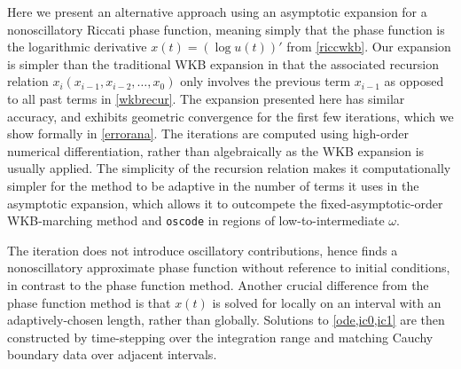\documentclass[10pt]{article}
\begin{document}
Here we present an alternative approach using
an asymptotic expansion for a nonoscillatory
Riccati phase function, meaning simply that the
phase function is the logarithmic derivative $x(t) = (\log u(t))'$ from \cref{riccwkb}.
%
Our expansion is simpler than the traditional WKB expansion in that the
associated recursion relation $x_i(x_{i-1}, x_{i-2}, \ldots, x_0)$ only
involves the previous term $x_{i-1}$ as opposed to all past terms in
\cref{wkbrecur}. 
%
The expansion presented here has similar accuracy, and
exhibits geometric convergence for the first few iterations, which we show
formally in \cref{errorana}. The iterations are computed using high-order
numerical differentiation, rather than algebraically as the WKB expansion is
usually applied.
%
The simplicity of the recursion relation makes it
computationally simpler for the method to be adaptive in the number of terms it
uses in the asymptotic expansion, which allows it to outcompete the
fixed-asymptotic-order WKB-marching method \cite{korner2022wkb,arnold2011wkb}
and \texttt{oscode} \cite{agocs2020efficient,agocs2020dense} in regions of low-to-intermediate $\omega$.
%

The iteration does not introduce oscillatory contributions,
hence finds a nonoscillatory approximate phase function without
reference to initial conditions, in contrast to the phase function method.
Another crucial difference from the phase function method is that $x(t)$ is solved for
locally on an interval with an adaptively-chosen length, rather than globally.
Solutions to \cref{ode,ic0,ic1} are then constructed by time-stepping over the
integration range and matching Cauchy boundary data over adjacent intervals.
%
\end{document}
